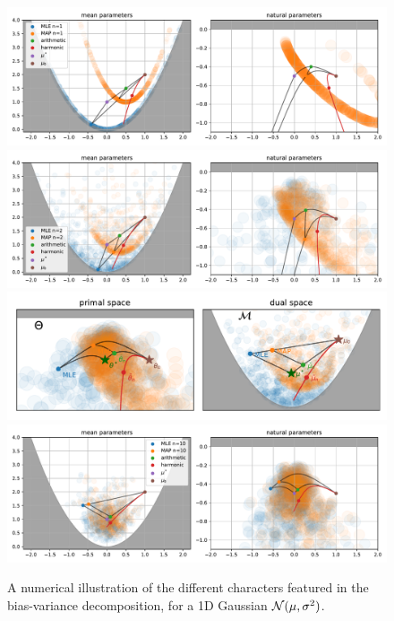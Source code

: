 \documentclass{article}
\begin{document}
\begin{figure}[p]
	\centering
	\includegraphics[width=\textwidth]{figs/thales/numerical_schema_n=1.pdf}
	\includegraphics[width=\textwidth]{figs/thales/numerical_schema_n=2.pdf}
	\includegraphics[width=\textwidth]{figs/thales/numerical_schema_n=3.pdf}
	\includegraphics[width=\textwidth]{figs/thales/numerical_schema_n=10.pdf}
	\caption{A numerical illustration of the different characters featured in the bias-variance decomposition, for a 1D Gaussian ${\mathcal N}(\mu, \sigma^2)$.}
	\label{app:fig:bias-variance-numerical}
\end{figure}

\clearpage
\end{document}
